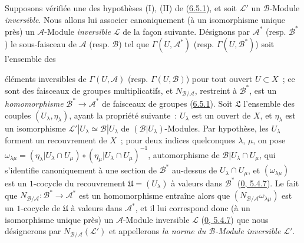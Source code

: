 \begin{env}[6.5.2]
\label{II.6.5.2-fr}
Supposons vérifiée une des hypothèses (I), (II) de
(\hyperref[II.6.5.1-fr]{6.5.1}), et soit $\mathcal{L}'$ un
$\mathcal{B}$-Module \emph{inversible}. Nous allons lui associer canoniquement
(à un isomorphisme unique près) un $\mathcal{A}$-Module \emph{inversible}
$\mathcal{L}$ de la façon suivante. Désignons par $\mathcal{A}^*$ (resp.
$\mathcal{B}^*$) le sous-faisceau de $\mathcal{A}$ (resp. $\mathcal{B}$) tel
que $\Gamma(U,\mathcal{A}^*)$ (resp. $\Gamma(U,\mathcal{B}^*)$) soit
l'ensemble des


éléments inversibles de $\Gamma(U,\mathcal{A})$ (resp.
$\Gamma(U,\mathcal{B})$) pour tout ouvert $U\subset X$~; ce sont des faisceaux
de groupes multiplicatifs, et $N_{\mathcal{B}/\mathcal{A}}$, restreint à
$\mathcal{B}^*$, est un \emph{homomorphisme}
$\mathcal{B}^*\to\mathcal{A}^*$ de faisceaux de groupes
(\hyperref[II.6.5.1-fr]{6.5.1}). Soit $\mathfrak{L}$ l'ensemble des couples
$(U_\lambda,\eta_\lambda)$, ayant la propriété suivante~: $U_\lambda$ est un
ouvert de $X$, et $\eta_\lambda$ est un isomorphisme
$\mathcal{L}'|U_\lambda\simeq\mathcal{B}|U_\lambda$ de
$(\mathcal{B}|U_\lambda)$-Modules. Par hypothèse, les $U_\lambda$ forment un
recouvrement de $X$~; pour deux indices quelconques $\lambda$, $\mu$, on pose
$\omega_{\lambda\mu}=(\eta_\lambda|U_\lambda\cap U_\mu)
\circ(\eta_\mu|U_\lambda\cap U_\mu)^{-1}$, automorphisme de
$\mathcal{B}|U_\lambda\cap U_\mu$, qui s'identifie canoniquement à une section
de $\mathcal{B}^*$ au-dessus de $U_\lambda\cap U_\mu$, et
$(\omega_{\lambda\mu})$ est un $1$-cocycle du recouvrement
$\mathfrak{U}=(U_\lambda)$ à valeurs dans $\mathcal{B}^*$
(\hyperref[0.5.4.7-fr]{0, 5.4.7}). Le fait que
$N_{\mathcal{B}/\mathcal{A}}:\mathcal{B}^*\to\mathcal{A}^*$ est un
homomorphisme entraîne alors que
$(N_{\mathcal{B}/\mathcal{A}}\omega_{\lambda\mu})$ est un $1$-cocycle de
$\mathfrak{U}$ à valeurs dans $\mathcal{A}^*$, et il lui correspond donc (à un
isomorphisme unique près) un $\mathcal{A}$-Module inversible $\mathcal{L}$
(\hyperref[0.5.4.7-fr]{0, 5.4.7}) que nous désignerons par
$N_{\mathcal{B}/\mathcal{A}}(\mathcal{L}')$ et appellerons \emph{la norme du
$\mathcal{B}$-Module inversible $\mathcal{L}'$}.


\end{env}
